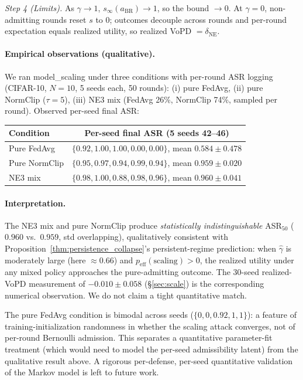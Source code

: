 \documentclass{article}
\begin{document}
\emph{Step 4 (Limits).} As $\gamma \to 1$, $s_\infty(a_{\mathrm{BR}}) \to 1$, so the bound $\to 0$. At $\gamma = 0$, non-admitting rounds reset $s$ to $0$; outcomes decouple across rounds and per-round expectation equals realized utility, so realized VoPD $= \delta_{\mathrm{NE}}$.

\paragraph{Empirical observations (qualitative).}
We ran model\_scaling under three conditions with per-round ASR logging (CIFAR-10, $N{=}10$, 5 seeds each, 50 rounds): (i) pure FedAvg, (ii) pure NormClip ($\tau{=}5$), (iii) NE3 mix (FedAvg 26\%, NormClip 74\%, sampled per round). Observed per-seed final ASR:
\begin{center}\small
\begin{tabular}{lc}
\toprule
Condition & Per-seed final ASR (5 seeds 42--46) \\
\midrule
Pure FedAvg     & $\{0.92, 1.00, 1.00, 0.00, 0.00\}$, mean $0.584 \pm 0.478$ \\
Pure NormClip   & $\{0.95, 0.97, 0.94, 0.99, 0.94\}$, mean $0.959 \pm 0.020$ \\
NE3 mix         & $\{0.98, 1.00, 0.88, 0.98, 0.96\}$, mean $0.960 \pm 0.041$ \\
\bottomrule
\end{tabular}
\end{center}

\paragraph{Interpretation.} The NE3 mix and pure NormClip produce \emph{statistically indistinguishable} ASR$_{50}$ ($0.960$ vs.\ $0.959$, std overlapping), qualitatively consistent with Proposition~\ref{thm:persistence_collapse}'s persistent-regime prediction: when $\hat\gamma$ is moderately large (here $\approx 0.66$) and $p_{\mathrm{eff}}(\text{scaling}) > 0$, the realized utility under any mixed policy approaches the pure-admitting outcome. The 30-seed realized-VoPD measurement of $-0.010 \pm 0.058$ (§\ref{sec:scale}) is the corresponding numerical observation. We do not claim a tight quantitative match.

The pure FedAvg condition is bimodal across seeds ($\{0,0,0.92,1,1\}$): a feature of training-initialization randomness in whether the scaling attack converges, not of per-round Bernoulli admission. This separates a quantitative parameter-fit treatment (which would need to model the per-seed admissibility latent) from the qualitative result above. A rigorous per-defense, per-seed quantitative validation of the Markov model is left to future work.
\end{document}
